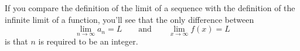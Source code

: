 \begin{frame}
If you compare the definition of the limit of a sequence with the definition of the infinite limit of a function, you'll see that the only difference between
\[
\lim_{n\to\infty} a_n = L \qquad \textrm{and} \qquad \lim_{x\to\infty}f(x) = L
\]
is that $n$ is required to be an integer.
\begin{center}
\ %
%
%
\end{center}
\end{frame}

